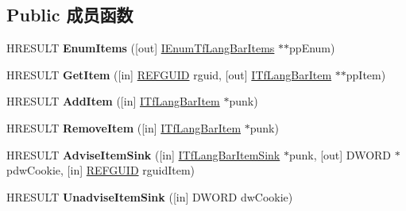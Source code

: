 \subsection*{Public 成员函数}
\begin{DoxyCompactItemize}
\item 
\mbox{\label{interface_i_tf_lang_bar_item_mgr_ac09fad43e346581fbb8a67f7f8ce3ab1}} 
H\+R\+E\+S\+U\+LT {\bfseries Enum\+Items} (\mbox{[}out\mbox{]} \hyperlink{interface_i_enum_tf_lang_bar_items}{I\+Enum\+Tf\+Lang\+Bar\+Items} $\ast$$\ast$pp\+Enum)
\item 
\mbox{\label{interface_i_tf_lang_bar_item_mgr_a6afe277902faf9049be02bc55b006589}} 
H\+R\+E\+S\+U\+LT {\bfseries Get\+Item} (\mbox{[}in\mbox{]} \hyperlink{struct___g_u_i_d}{R\+E\+F\+G\+U\+ID} rguid, \mbox{[}out\mbox{]} \hyperlink{interface_i_tf_lang_bar_item}{I\+Tf\+Lang\+Bar\+Item} $\ast$$\ast$pp\+Item)
\item 
\mbox{\label{interface_i_tf_lang_bar_item_mgr_a018849d9982278bd12cbe9974386ee1d}} 
H\+R\+E\+S\+U\+LT {\bfseries Add\+Item} (\mbox{[}in\mbox{]} \hyperlink{interface_i_tf_lang_bar_item}{I\+Tf\+Lang\+Bar\+Item} $\ast$punk)
\item 
\mbox{\label{interface_i_tf_lang_bar_item_mgr_ab2ff50e6ebac421e73c90a510823d808}} 
H\+R\+E\+S\+U\+LT {\bfseries Remove\+Item} (\mbox{[}in\mbox{]} \hyperlink{interface_i_tf_lang_bar_item}{I\+Tf\+Lang\+Bar\+Item} $\ast$punk)
\item 
\mbox{\label{interface_i_tf_lang_bar_item_mgr_a87264565a20dc33526decb753f452189}} 
H\+R\+E\+S\+U\+LT {\bfseries Advise\+Item\+Sink} (\mbox{[}in\mbox{]} \hyperlink{interface_i_tf_lang_bar_item_sink}{I\+Tf\+Lang\+Bar\+Item\+Sink} $\ast$punk, \mbox{[}out\mbox{]} D\+W\+O\+RD $\ast$pdw\+Cookie, \mbox{[}in\mbox{]} \hyperlink{struct___g_u_i_d}{R\+E\+F\+G\+U\+ID} rguid\+Item)
\item 
\mbox{\label{interface_i_tf_lang_bar_item_mgr_a630266fc37130e58bc6f6bf3a5b4b2b8}} 
H\+R\+E\+S\+U\+LT {\bfseries Unadvise\+Item\+Sink} (\mbox{[}in\mbox{]} D\+W\+O\+RD dw\+Cookie)
\item 

\end{DoxyCompactItemize}
